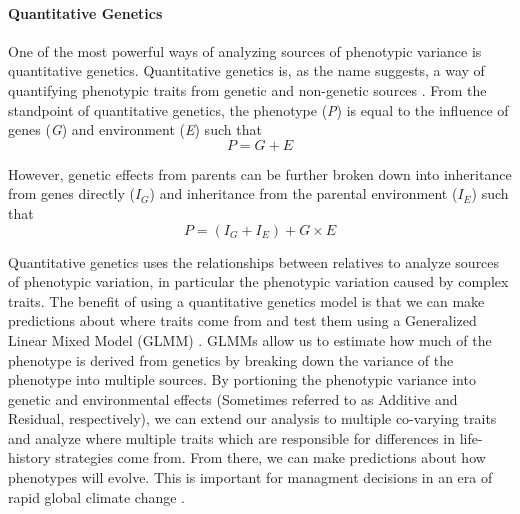 \documentclass[12pt]{extarticle}
\begin{document}
\paragraph{Quantitative Genetics}
One of the most powerful ways of analyzing sources of phenotypic variance is quantitative genetics. Quantitative genetics is, as the name suggests, a way of quantifying phenotypic traits from genetic and non-genetic sources \citep{Wilson2010}.
From the standpoint of quantitative genetics, the phenotype (\textit{P}) is equal to the influence of genes (\textit{G}) and environment (\textit{E}) such that $$P = G + E $$

However, genetic effects from parents can be further broken down into inheritance from genes directly ($I_G$) and inheritance from the parental environment ($I_E$) such that $$P = (I_G + I_E) + G \times E$$

Quantitative genetics uses the relationships between relatives to analyze sources of phenotypic variation, in particular the phenotypic variation caused by complex traits.
The benefit of using a quantitative genetics model is that we can make predictions about where traits come from and test them using a Generalized Linear Mixed Model (GLMM) \citep{Wilson2010, Bolker2009, VanDooren2016}. GLMMs allow us to estimate how much of the phenotype is derived from genetics by breaking down the variance of the phenotype into multiple sources. By portioning the phenotypic variance into genetic and environmental effects (Sometimes referred to as Additive and Residual, respectively), we can extend our analysis to multiple co-varying traits and analyze where multiple traits which are responsible for differences in life-history strategies come from. From there, we can make predictions about how phenotypes will evolve. This is important for managment decisions in an era of rapid global climate change \citep{VanDooren2016}.
\end{document}
